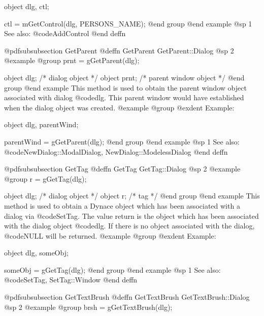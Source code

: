 object  dlg, ctl;

ctl = mGetControl(dlg, PERSONS_NAME);
@end group
@end example
@sp 1
See also:  @code{AddControl}
@end deffn












@pdfsubsubsection {GetParent}
@deffn {GetParent} GetParent::Dialog
@sp 2
@example
@group
prnt = gGetParent(dlg);

object  dlg;    /*  dialog object         */
object  prnt;   /*  parent window object  */
@end group
@end example
This method is used to obtain the parent window object associated
with dialog @code{dlg}.  This parent window would have established
when the dialog object was created.
@example
@group
@exdent Example:

object  dlg, parentWind;

parentWind = gGetParent(dlg);
@end group
@end example
@sp 1
See also:  @code{NewDialog::ModalDialog, NewDialog::ModelessDialog}
@end deffn















@pdfsubsubsection {GetTag}
@deffn {GetTag} GetTag::Dialog
@sp 2
@example
@group
r = gGetTag(dlg);

object  dlg;   /*  dialog object  */
object  r;     /*  tag            */
@end group
@end example
This method is used to obtain a Dynace object which has been associated
with a dialog via @code{SetTag}.  The value return is the object which has
been associated with the dialog object @code{dlg}.  If there is no object
associated with the dialog, @code{NULL} will be returned.
@example
@group
@exdent Example:

object  dlg, someObj;

someObj = gGetTag(dlg);
@end group
@end example
@sp 1
See also:  @code{SetTag, SetTag::Window}
@end deffn










@pdfsubsubsection {GetTextBrush}
@deffn {GetTextBrush} GetTextBrush::Dialog
@sp 2
@example
@group
brsh = gGetTextBrush(dlg);

